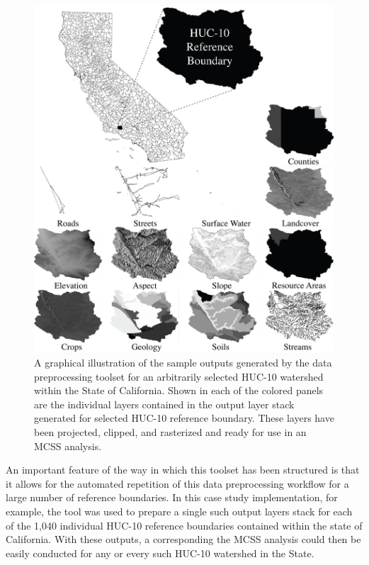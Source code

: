         \begin{figure}[!h]
            \includegraphics[width=5.5in]{figures/example_data_output.png}
            \caption{A graphical illustration of the sample outputs generated by the data preprocessing toolset for an arbitrarily selected HUC-10 watershed within the State of California. Shown in each of the colored panels are the individual layers contained in the output layer stack generated for selected HUC-10 reference boundary. These layers have been projected, clipped, and rasterized and ready for use in an MCSS analysis.}
            \label{fig:SampleOutput}
        \end{figure}

    An important feature of the way in which this toolset has been structured is that it allows for the automated repetition of this data preprocessing workflow for a large number of reference boundaries. In this case study implementation, for example, the tool was used to prepare a single such output layers stack for each of the 1,040 individual HUC-10 reference boundaries contained within the state of California. With these outputs, a corresponding the MCSS analysis could then be easily conducted for any or every such HUC-10 watershed in the State. 
   
